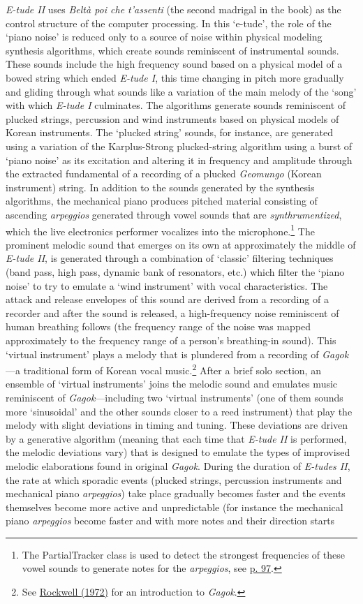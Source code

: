 \emph{E-tude II} uses \emph{Belt\`{a} poi che t'assenti} (the second madrigal in the book) as the control structure of the computer processing. In this `e-tude', the role of the `piano noise' is reduced only to a source of noise within physical modeling synthesis algorithms, which create sounds reminiscent of instrumental sounds. These sounds include the high frequency sound based on a physical model of a bowed string which ended \emph{E-tude I}, this time changing in pitch more gradually and gliding through what sounds like a variation of the main melody of the `song' with which \emph{E-tude I} culminates. The algorithms generate sounds reminiscent of plucked strings, percussion and wind instruments based on physical models of Korean instruments. The `plucked string' sounds, for instance, are generated using a variation of the Karplus-Strong plucked-string algorithm using a burst of `piano noise' as its excitation and altering it in frequency and amplitude through the extracted fundamental of a recording of a plucked \emph{Geomungo} (Korean instrument) string. In addition to the sounds generated by the synthesis algorithms, the mechanical piano produces pitched material consisting of ascending \emph{arpeggios} generated through vowel sounds that are \emph{synthrumentized}, which the live electronics performer vocalizes into the microphone.\footnote{The PartialTracker class is used to detect the strongest frequencies of these vowel sounds to generate notes for the \emph{arpeggios}, see \hyperlink{partrack}{p. 97}.} The prominent melodic sound that emerges on its own at approximately the middle of \emph{E-tude II}, is generated through a combination of `classic' filtering techniques (band pass, high pass, dynamic bank of resonators, etc.) which filter the `piano noise' to try to emulate a `wind instrument' with vocal characteristics. The attack and release envelopes of this sound are derived from a recording of a recorder and after the sound is released, a high-frequency noise reminiscent of human breathing follows (the frequency range of the noise was mapped approximately to the frequency range of a person's breathing-in sound). This `virtual instrument' plays a melody that is plundered from a recording of \emph{Gagok}---a traditional form of Korean vocal music.\footnote{See \hyperlink{rockwell}{Rockwell (1972)} for an introduction to \emph{Gagok}.} After a brief solo section, an ensemble of `virtual instruments' joins the melodic sound and emulates music reminiscent of \emph{Gagok}---including two `virtual instruments' (one of them sounds more `sinusoidal' and the other sounds closer to a reed instrument) that play the melody with slight deviations in timing and tuning. These deviations are driven by a generative algorithm (meaning that each time that \emph{E-tude II} is performed, the melodic deviations vary) that is designed to emulate the types of improvised melodic elaborations found in original \emph{Gagok}. During the duration of \emph{E-tudes II}, the rate at which sporadic events (plucked strings, percussion instruments and mechanical piano \emph{arpeggios}) take place gradually becomes faster and the events themselves become more active and unpredictable (for instance the mechanical piano \emph{arpeggios} become faster and with more notes and their direction starts 